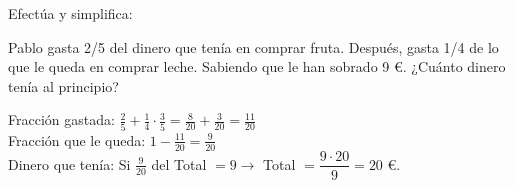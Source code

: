 \documentclass[addpoints,spanish, 12pt,a4paper]{exam}
\begin{document}
\begin{questions}

\question Efectúa y simplifica:

\addpoints

\question[1] Pablo gasta 2/5 del dinero que tenía en comprar fruta. Después, gasta 1/4 de lo que le queda en comprar leche. Sabiendo que le han sobrado 9 \euro. ¿Cuánto dinero tenía al principio?
\begin{solution} Fracción gastada: $\frac{2}{5}+\frac{1}{4}\cdot\frac{3}{5}=\frac{8}{20}+\frac{3}{20}=\frac{11}{20}$  \\
Fracción que le queda: $1-\frac{11}{20}=\frac{9}{20}$ \\
Dinero que tenía: Si $\frac{9}{20}$ del Total $= 9\to$ Total $=\dfrac{9\cdot20}{9}=20$ \euro. \end{solution}


\end{questions}
\end{document}
